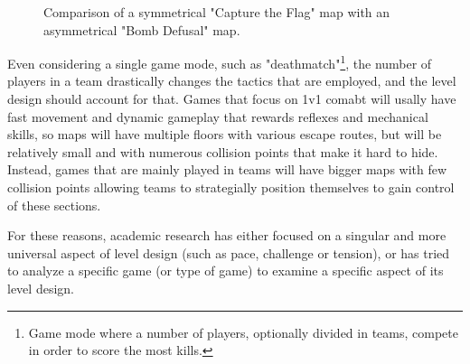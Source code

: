 \documentclass{Configuration_Files/PoliMi3i_thesis}
\begin{document}
\begin{figure}[H]
    \centering
    \quad
    \caption[Map comparison]{Comparison of a symmetrical "Capture the Flag" map with an asymmetrical "Bomb Defusal" map.}
    \label{fig:maps_compare}
\end{figure}

Even considering a single game mode, such as "deathmatch"\footnote{Game mode where a number of players, optionally divided in teams, compete in order to score the most kills.}, the number of players in a team drastically changes the tactics that are employed, and the level design should account for that. Games that focus on 1v1 comabt will usally have fast movement and dynamic gameplay that rewards reflexes and mechanical skills, so maps will have multiple floors with various escape routes, but will be relatively small and with numerous collision points that make it hard to hide. Instead, games that are mainly played in teams will have bigger maps with few collision points allowing teams to strategially position themselves to gain control of these sections.

For these reasons, academic research has either focused on a singular and more universal aspect of level design (such as pace, challenge or tension), or has tried to analyze a specific game (or type of game) to examine a specific aspect of its level design.
\end{document}
